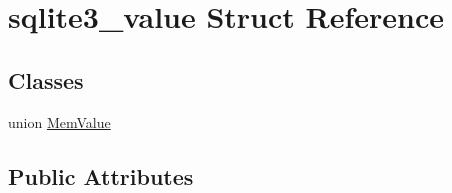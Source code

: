\hypertarget{structsqlite3__value}{}\section{sqlite3\+\_\+value Struct Reference}
\label{structsqlite3__value}
\subsection*{Classes}
\begin{DoxyCompactItemize}
\item 
union \mbox{\hyperlink{unionsqlite3__value_1_1_mem_value}{Mem\+Value}}
\end{DoxyCompactItemize}
\subsection*{Public Attributes}
